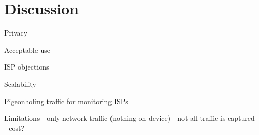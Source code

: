 \section{Discussion}

Privacy

Acceptable use

ISP objections

Scalability

Pigeonholing traffic for monitoring ISPs

Limitations
 - only network traffic (nothing on device)
 - not all traffic is captured
 - cost?
 